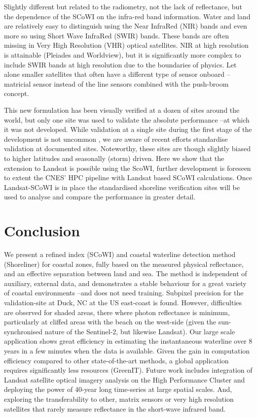 \documentclass[remotesensing,article,submit,pdftex,moreauthors]{Definitions/mdpi}
\begin{document}
Slightly different but related to the radiometry, not the lack of reflectance, but the dependence of the SCoWI on the infra-red band information. Water and land are relatively easy to distinguish using the Near InfraRed (NIR) bands and even more so using Short Wave InfraRed (SWIR) bands. These bands are often missing in Very High Resolution (VHR) optical satellites. NIR at high resolution is attainable (Pleiades and Worldview), but it is significantly more complex to include SWIR bands at high resolution due to the boundaries of physics. Let alone smaller satellites that often have a different type of sensor onboard --matricial sensor instead of the line sensors combined with the push-broom concept. 

This new formulation has been visually verified at a dozen of sites around the world, but only one site was used to validate the absolute performance --at which it was not developed. While validation at a single site during the first stage of the development is not uncommon \citep{VOS2019_google,CASTELLE2021107707}, we are aware of recent efforts standardise validation at documented sites. Noteworthy, these sites are though slightly biased to higher latitudes and seasonally (storm) driven. Here we show that the extension to Landsat is possible using the ScoWI, further development is foreseen to extent the CNES' HPC pipeline with Landsat based SCoWI calculations. Once Landsat-SCoWI is in place the standardised shoreline verification sites will be used to analyse and compare the performance in greater detail. 

\section{Conclusion}
We present a refined index (SCoWI) and coastal waterline detection method (Shoreliner) for coastal zones, fully based on the measured physical reflectance, and an effective separation between land and sea. The method is independent of auxiliary, external data, and demonstrates a stable behaviour for a great variety of coastal environments --and does not need training. Subpixel precision for the validation-site at Duck, NC at the US east-coast is found. However, difficulties are observed for shaded areas, there where photon reflectance is minimum, particularly at cliffed areas with the beach on the west-side (given the sun-synchronised nature of the Sentinel-2, but likewise Landsat). Our large scale application shows great efficiency in estimating the instantaneous waterline over 8 years in a few minutes when the data is available. Given the gain in computation efficiency compared to other state-of-the-art methods, a global application requires significantly less resources (GreenIT). Future work includes integration of Landsat satellite optical imagery analysis on the High Performance Cluster and deploying the power of 40-year long time-series at large spatial scales. And, exploring the transferability to other, matrix sensors or very high resolution satellites that rarely measure reflectance in the short-wave infrared band. 
\end{document}
